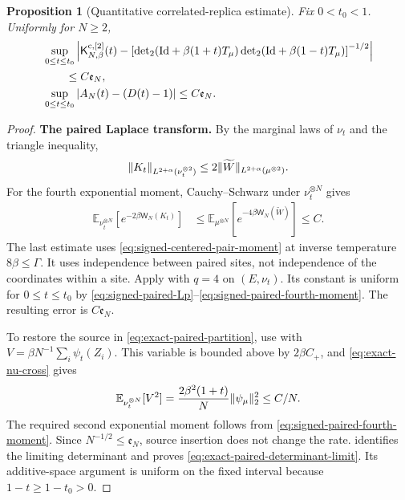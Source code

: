 \documentclass[11pt,reqno]{amsart}
\numberwithin{equation}{section}
\theoremstyle{plain}
\newtheorem{prop}[prop]{Proposition}
\theoremstyle{remark}
\DeclarePairedDelimiter{\norm}{\lVert}{\rVert}
\newcommand{\E}{{\mathbb{E}}}
\newcommand{\K}{{\mathsf{K}}}
\newcommand{\tl}{\widetilde}
\newcommand{\be}{\beta}
\newcommand{\detTwo}{\operatorname{det}_2}
\newcommand{\step}[1]{\par\medskip\noindent\textbf{#1}}
\begin{document}
\begin{prop}[Quantitative correlated-replica estimate]\label{prop:exact-paired-determinant}
Fix $0<t_0<1$.  Uniformly for $N\geq2$,
\begin{align}
 &\sup_{0\leq t\leq t_0}\left|\K^{\mathrm c,[2]}_{N,\be}(t)
 -\left[\detTwo(\mathrm{Id}+\be(1+t)T_\mu)
 \detTwo(\mathrm{Id}+\be(1-t)T_\mu)\right]^{-1/2}\right|
 \notag\\
 &\qquad\leq C\mathfrak e_N,
 \label{eq:exact-paired-determinant-limit}\\
 &\sup_{0\leq t\leq t_0}|A_N(t)-(D(t)-1)|\leq C\mathfrak e_N.
 \label{eq:quantitative-replica-rate}
\end{align}
\end{prop}
\begin{proof}
\step{The paired Laplace transform.}
By the marginal laws of $\nu_t$ and the triangle inequality,
\begin{equation}\label{eq:signed-paired-Lp}
 \norm{K_t}_{L^{2+\alpha}(\nu_t^{\otimes2})}
 \leq2\norm{\tl W}_{L^{2+\alpha}(\mu^{\otimes2})}.
\end{equation}
For the fourth exponential moment, Cauchy--Schwarz under $\nu_t^{\otimes N}$
gives
\begin{align}
 \E_{\nu_t^{\otimes N}}\left[e^{-2\be\mathsf W_N(K_t)}\right]
 &\leq\E_{\mu^{\otimes N}}
       \left[e^{-4\be\mathsf W_N(\tl W)}\right]\leq C.
 \label{eq:signed-paired-fourth-moment}
\end{align}
The last estimate uses \eqref{eq:signed-centered-pair-moment} at inverse
temperature $8\be\leq\Gamma$.  It uses independence between paired sites,
not independence of the coordinates within a site.  Apply
 with $q=4$ on $(E,\nu_t)$.  Its
constant is uniform for $0\leq t\leq t_0$ by
\eqref{eq:signed-paired-Lp}--\eqref{eq:signed-paired-fourth-moment}.  The
resulting error is $C\mathfrak e_N$.

To restore the source in \eqref{eq:exact-paired-partition}, use
 with
$V=\be N^{-1}\sum_i\psi_t(Z_i)$.  This variable is bounded above by
$2\be C_+$, and \eqref{eq:exact-nu-cross} gives
\begin{equation}\label{eq:signed-paired-source-variance}
 \E_{\nu_t^{\otimes N}}[V^2]
 =\frac{2\be^2(1+t)}N\norm{\psi_\mu}_2^2\leq C/N.
\end{equation}
The required second exponential moment follows from
\eqref{eq:signed-paired-fourth-moment}.  Since $N^{-1/2}\leq\mathfrak e_N$,
source insertion does not change the rate.
 identifies the limiting determinant and
proves \eqref{eq:exact-paired-determinant-limit}.  Its additive-space
argument is uniform on the fixed interval because $1-t\geq1-t_0>0$.


\end{proof}
\end{document}
